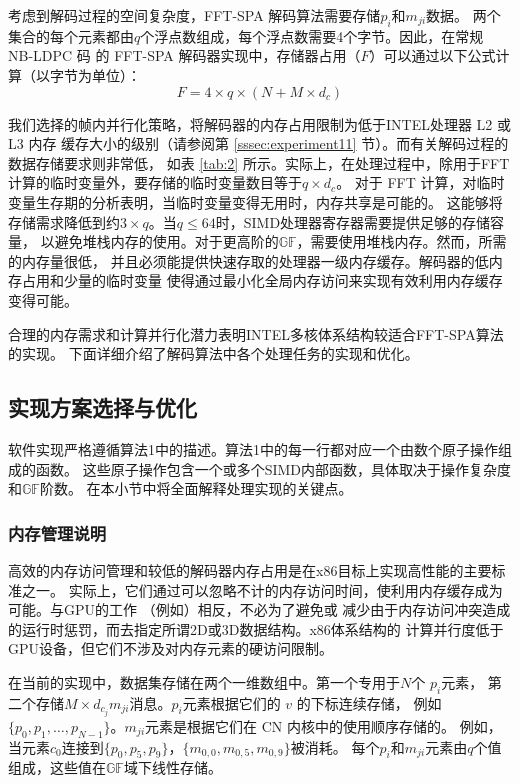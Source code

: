 \documentclass{cjc}
\begin{document}
  考虑到解码过程的空间复杂度，FFT-SPA 解码算法需要存储$p_i$和$m_{ji}$数据。
  两个集合的每个元素都由$q$个浮点数组成，每个浮点数需要4个字节。因此，在常规 NB-LDPC 码
  的 FFT-SPA 解码器实现中，存储器占用（$F$）可以通过以下公式计算（以字节为单位）：
  $$F=4\times{q}\times(N+M\times{d_c})$$

  我们选择的帧内并行化策略，将解码器的内存占用限制为低于INTEL处理器 L2 或 L3 内存
  缓存大小的级别（请参阅第 \ref{sssec:experiment11} 节）。而有关解码过程的数据存储要求则非常低，
  如表 \ref{tab:2} 所示。实际上，在处理过程中，除用于FFT计算的临时变量外，要存储的临时变量数目等于$q\times{d_c}$。
  对于 FFT 计算，对临时变量生存期的分析表明，当临时变量变得无用时，内存共享是可能的。
  这能够将存储需求降低到约$3\times{q}$。当$q\leq64$时，SIMD处理器寄存器需要提供足够的存储容量，
  以避免堆栈内存的使用。对于更高阶的$\mathbb{GF}$，需要使用堆栈内存。然而，所需的内存量很低，
  并且必须能提供快速存取的处理器一级内存缓存。解码器的低内存占用和少量的临时变量
  使得通过最小化全局内存访问来实现有效利用内存缓存变得可能。

  合理的内存需求和计算并行化潜力表明INTEL多核体系结构较适合FFT-SPA算法的实现。
  下面详细介绍了解码算法中各个处理任务的实现和优化。

\subsection{实现方案选择与优化}

  软件实现严格遵循算法1中的描述。算法1中的每一行都对应一个由数个原子操作组成的函数。
  这些原子操作包含一个或多个SIMD内部函数，具体取决于操作复杂度和$\mathbb{GF}$阶数。
  在本小节中将全面解释处理实现的关键点。

\subsubsection{内存管理说明}

  高效的内存访问管理和较低的解码器内存占用是在x86目标上实现高性能的主要标准之一。
  实际上，它们通过可以忽略不计的内存访问时间，使利用内存缓存成为可能。与GPU的工作
  （例如\cite{noauthor_beermann_nodate,andrade_optimized_2014}）相反，不必为了避免或
  减少由于内存访问冲突造成的运行时惩罚，而去指定所谓2D或3D数据结构。x86体系结构的
  计算并行度低于GPU设备，但它们不涉及对内存元素的硬访问限制。

  在当前的实现中，数据集存储在两个一维数组中。第一个专用于$N$个 $p_i$元素，
  第二个存储$M\times{d_{c_j}}m_{ji}$消息。$p_i$元素根据它们的 $v$ 的下标连续存储，
  例如$\{p_0,p_1,\dots,p_{N−1}\}$。$m_{ji}$元素是根据它们在 CN 内核中的使用顺序存储的。
  例如，当元素$c_0$连接到$\{p_0,p_5,p_9\}$，$\{m_{0,0},m_{0,5},m_{0,9}\}$被消耗。
  每个$p_i$和$m_{ji}$元素由$q$个值组成，这些值在$\mathbb{GF}$域下线性存储。
\end{document}
